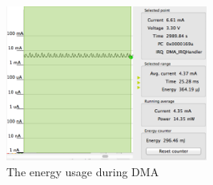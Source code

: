 \begin{figure}[H]
    \centering
    \includegraphics[width=250px]{figures/sw/fpga.png}
    \caption{The energy usage during DMA}
    \label{fig:fpga}
\end{figure}
